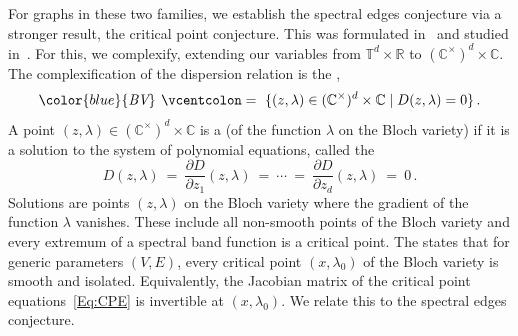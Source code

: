 \documentclass[12pt]{amsart}
\theoremstyle{remark}
\newcommand{\CC}{{\mathbb C}}
\newcommand{\RR}{{\mathbb R}}
\newcommand{\TT}{{\mathbb T}}
\newcommand{\BV}{{\textit{BV}}\hspace{0.5pt}}
\newcommand{\defcolor}[1]{{\color{blue}#1}}
\newcommand{\demph}[1]{\defcolor{{\sl #1}}}
\begin{document}
For graphs in these two families, we establish the spectral edges conjecture via  a stronger result, 
the critical point conjecture.
This was formulated in~\cite{DKS} and studied in~\cite{FS24}.
For this, we complexify, extending our variables from $\TT^d\times\RR$ to $(\CC^\times)^d\times\CC$.
The complexification of the dispersion relation is the \demph{Bloch variety},
\[
   \defcolor{\BV}\ \vcentcolon=\ \{ (z,\lambda)\in(\CC^\times)^d\times\CC \mid D(z,\lambda)=0\}\,.
\]
A  point $(z,\lambda) \in (\CC^\times)^d \times \CC$ is a \demph{critical point} (of the function $\lambda$ on the
Bloch variety) if it is a solution to the system of polynomial equations,
called the \demph{critical point equations}
%
 \begin{equation}\label{Eq:CPE}
   D(z,\lambda)\ =\ \frac{\partial D}{\partial z_1}(z,\lambda)\ =\
   \dotsb\ =\ \frac{\partial D}{\partial z_d}(z,\lambda)\  =\ 0\,.
 \end{equation}
%
Solutions are points $(z,\lambda)$ on the Bloch variety where the gradient of the function $\lambda$ vanishes.
These include all non-smooth points of the Bloch variety and every extremum of a
spectral band function is a critical point.
The \demph{critical point conjecture} states that for generic parameters $(V,E)$, every critical point
$(x,\lambda_0)$ of the Bloch variety is smooth and isolated.
Equivalently, the Jacobian matrix of the critical point equations~\eqref{Eq:CPE} is invertible at $(x,\lambda_0)$.
We relate this to the spectral edges conjecture.
\end{document}
